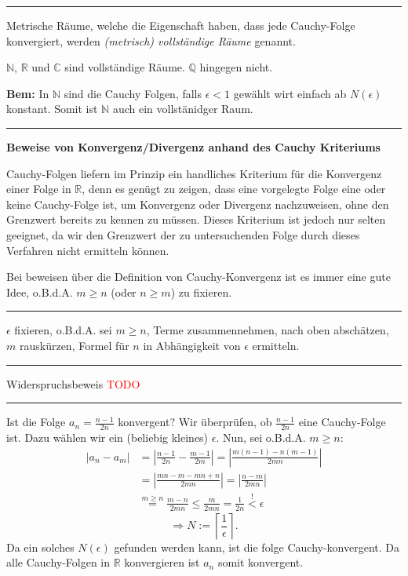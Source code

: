 \documentclass[a4paper,landscape,8pt]{extarticle}
\newcommand{\N}{\mathbb{N}}
\newcommand{\Q}{\mathbb{Q}}
\newcommand{\R}{\mathbb{R}}
\newcommand{\C}{\mathbb{C}}
\newcommand{\abs}[1]{\left\lvert #1 \right\rvert}
\newcommand{\ceil}[1]{\left\lceil #1 \right\rceil}
\newcommand{\todo}{\textcolor{red}{TODO }}
\newcommand{\sep}{\vspace{5pt}\noindent\hrule\vspace{5pt}}
\newcommand{\Bem}{\textbf{Bem: }}
\begin{document}
\begin{multicols*}{4}
\sep

\Def Metrische Räume, welche die Eigenschaft haben, dass jede Cauchy-Folge
konvergiert, werden \emph{(metrisch) vollständige Räume} genannt.

\Bsp $\N$, $\R$ und $\C$ sind vollständige Räume. $\Q$ hingegen nicht.

\Bem In $\N$ sind die Cauchy Folgen, falls $\epsilon < 1$ gewählt wirt einfach
ab $N(\epsilon)$ konstant. Somit ist $\N$ auch ein vollstänidger Raum.

\sep

\textbf{Beweise von Konvergenz/Divergenz anhand des Cauchy Kriteriums}

Cauchy-Folgen liefern im Prinzip ein handliches Kriterium für die Konvergenz
einer Folge in $\R$, denn es genügt zu zeigen, dass eine vorgelegte Folge eine
oder keine Cauchy-Folge ist, um Konvergenz oder Divergenz nachzuweisen, ohne den
Grenzwert bereits zu kennen zu müssen. Dieses Kriterium ist jedoch nur selten
geeignet, da wir den Grenzwert der zu untersuchenden Folge durch dieses
Verfahren nicht ermitteln können.

\Trick Bei beweisen über die Definition von Cauchy-Konvergenz ist es immer eine
gute Idee, o.B.d.A. $m\geq n$ (oder $n\geq m$) zu fixieren.

\sep

\Vorgehen $\epsilon$ fixieren, o.B.d.A. sei $m\geq n$, Terme zusammennehmen,
nach oben abschätzen, $m$ rauskürzen, Formel für $n$ in Abhängigkeit von
$\epsilon$ ermitteln.


\begin{warmup}
\sep

\Vorgehen Widerspruchsbeweis \todo

\sep

\Bsp Ist die Folge $a_n=\frac{n-1}{2n}$ konvergent?
Wir überprüfen, ob $\frac{n-1}{2n}$ eine Cauchy-Folge ist. Dazu wählen wir ein
(beliebig kleines) $\epsilon$. Nun, sei o.B.d.A. $m\geq n$:
\begin{align*}
\abs{a_n - a_m} &= \abs{\frac{n-1}{2n}-\frac{m-1}{2m}}
= \abs{\frac{m(n-1) -n(m-1)}{2mn}}\\
&= \abs{\frac{mn - m -mn +n}{2mn}} = \abs{\frac{n-m}{2mn}}\\
&\stackrel{m\geq n}{=} \frac{m-n}{2mn} \leq \frac{m}{2mn}=\frac{1}{2n}
\stackrel{!}{<}\epsilon 
\end{align*}
\[
\Longrightarrow N:=\ceil{\frac{1}{\epsilon}}.
\]
Da ein solches $N(\epsilon)$ gefunden werden kann, ist die folge
Cauchy-konvergent. Da alle Cauchy-Folgen in $\R$ konvergieren ist $a_n$ somit
konvergent.


\end{warmup}
\end{multicols*}
\end{document}
